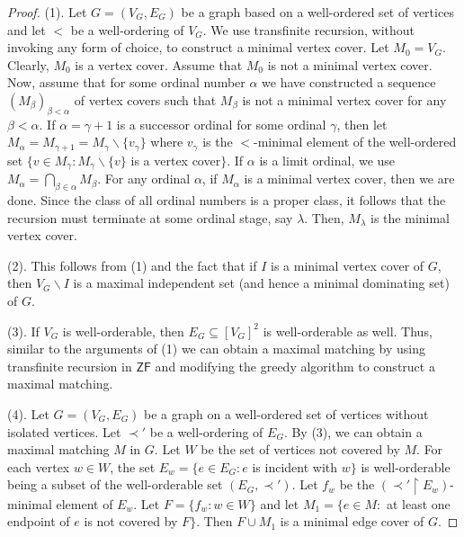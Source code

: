\documentclass[12pt,reqno,a4paper]{amsart}
\theoremstyle{definition}
\begin{document}
	\begin{proof}
		(1).  Let $G=(V_{G}, E_{G})$ be a graph based on a well-ordered set of vertices and let $<$ be a well-ordering of $V_{G}$.
		We use transfinite recursion, without invoking any form of choice, to construct a minimal vertex cover. Let $M_{0}=V_{G}$. Clearly, $M_{0}$ is a vertex cover. Assume that $M_{0}$ is not a minimal vertex cover.
		Now, assume that for some ordinal number $\alpha$ we
		have constructed a sequence $(M_{\beta})_{\beta<\alpha}$ of vertex covers such that $M_{\beta}$ is not a minimal vertex cover for any $\beta<\alpha$. If $\alpha=\gamma+1$ is a successor ordinal for some ordinal $\gamma$, then let $M_{\alpha}=M_{\gamma+1}=M_{\gamma}\backslash\{v_{\gamma}\}$   
		where $v_{\gamma}$ is the $<$-minimal element of the well-ordered set $\{v\in M_{\gamma}: M_{\gamma}\backslash \{v\}$ is a vertex cover$\}$. If $\alpha$ is a limit ordinal, we use $M_{\alpha}=\bigcap_{\beta\in \alpha} M_{\beta}$.
		For any ordinal $\alpha$, if $M_{\alpha}$ is a minimal vertex cover, then we are done. Since the class of all ordinal numbers is a proper class, it follows that the recursion must terminate at some ordinal stage, say $\lambda$. Then, $M_{\lambda}$ is the minimal vertex cover.
		
		
		(2). This follows from (1) and the fact that if $I$ is a minimal vertex cover of $G$, then $V_{G}\backslash I$ is a maximal
		independent set (and hence a minimal dominating set) of $G$.
		
		(3). If $V_{G}$ is well-orderable, then $E_{G}\subseteq [V_{G}]^{2}$ is well-orderable as well. Thus, similar to the arguments of (1) we can obtain a maximal matching by using transfinite recursion in $\mathsf{ZF}$ and modifying the greedy algorithm to construct a maximal matching.  
		
		(4). Let $G=(V_{G}, E_{G})$ be a graph on a well-ordered set of vertices without isolated vertices. Let $\prec'$
		be a well-ordering of $E_{G}$. By (3), we can obtain a maximal matching $M$ in $G$. Let $W$ be the set of vertices not covered by $M$. For each vertex $w\in W$, the set $E_{w}=\{e\in E_{G}: e$ is incident with $w\}$ is well-orderable being a subset of the well-orderable set $(E_{G},\prec')$.  Let $f_{w}$ be the $(\prec'\restriction E_{w})$-minimal element of $E_{w}$. Let $F=\{f_{w}:w\in W\}$ and let $M_{1}= \{e \in M:$ at least one endpoint of $e$ is not covered by $F\}$. Then $F\cup M_{1}$ is a minimal edge cover of $G$.
	\end{proof}
	
\end{document}
